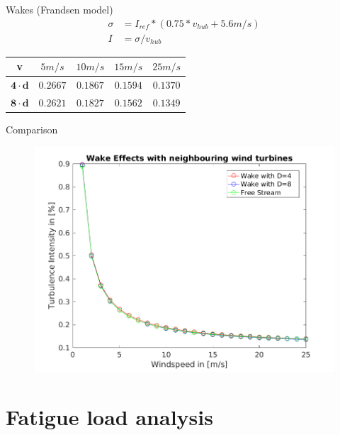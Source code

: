 \documentclass[12pt,t]{beamer}
\begin{document}
\begin{frame}
\normalsize
Wakes (Frandsen model)
\begin{align*}
 \sigma &= I_{ref}*(0.75*v_{hub}+5.6m/s) \\
     I &= \sigma/v_{hub}
\end{align*}
\begin{table}[H]
\centering
\begin{tabular}{| c | c | c | c | c |}
\hline
\textbf{v} & $5m/s$ & $10m/s$ & $15m/s$ & $25m/s$ \\
\hline
$\mathbf{4 \cdot d}$ & $0.2667$ & $0.1867$ & $0.1594$ & $ 0.1370$	\\
\hline
$\mathbf{8 \cdot d}$ & $0.2621$ & $0.1827$ & $0.1562$ & $0.1349$	\\
\hline
\end{tabular}
\end{table}
\end{frame}

\begin{frame}
\huge
Comparison
\begin{figure}[H]
\centering
\includegraphics[width=0.9\linewidth]{../CIP_5/CIP_Tutorial_5_-_Windfield_and_wake_simulation/wake_effects_5.png}
\end{figure} 
\end{frame}

\section{Fatigue load analysis}
\end{document}
